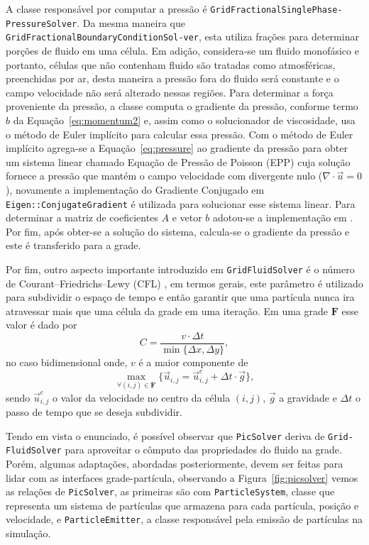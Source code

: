 \documentclass[12pt,a4paper,dvipsnames]{article}
\newcommand{\figref}[1]{Figura~\ref{#1}}
\newcommand{\eqnref}[1]{Equação~\eqref{#1}}
\begin{document}
A classe responsável por computar a pressão é \texttt{GridFractionalSinglePhase-\linebreak PressureSolver}. Da mesma maneira que \texttt{GridFractionalBoundaryConditionSol-\linebreak ver}, esta utiliza frações para determinar porções de fluido em uma célula. Em adição, considera-se um fluido monofásico e portanto, células que não contenham fluido são tratadas como atmosféricas, preenchidas por ar, desta maneira a pressão fora do fluido será constante e o campo velocidade não será alterado nessas regiões. Para determinar a força proveniente da pressão, a classe computa o gradiente da pressão, conforme termo $b$ da \eqnref{eq:momentum2} e, assim como o solucionador de viscosidade, usa o método de Euler implícito para calcular essa pressão. Com o método de Euler implícito agrega-se a \eqnref{eq:pressure} ao gradiente da pressão para obter um sistema linear chamado Equação de Pressão de Poisson (EPP) cuja solução fornece a pressão que mantém o campo velocidade com divergente nulo ($\nabla \cdot \Vec{u} = 0$), novamente a implementação do Gradiente Conjugado em \texttt{Eigen::ConjugateGradient} é utilizada para solucionar esse sistema linear. Para determinar a matriz de coeficientes $A$ e vetor $b$ adotou-se a implementação em \cite{fluidcoupling07}. Por fim, após obter-se a solução do sistema, calcula-se o gradiente da pressão e este é transferido para a grade.

Por fim, outro aspecto importante introduzido em \texttt{GridFluidSolver} é o número de Courant–Friedrichs–Lewy (CFL) \cite{cflnumber}, em termos gerais, este parâmetro é utilizado para subdividir o espaço de tempo e então garantir que uma partícula nunca ira atravessar mais que uma célula da grade em uma iteração. Em uma grade $\mathbf{F}$ esse valor é dado por
\begin{equation}
    C = \frac{v \cdot \Delta t}{\min \{ \Delta x, \Delta y \}},   
\end{equation}
no caso bidimensional onde, $v$ é a maior componente de
\begin{equation}
    \max_{\forall (i, j) \in \mathbf{F}} \{\Vec{u}_{i, j} = \Vec{u}^c_{i, j} + \Delta t \cdot \Vec{g}\},
\end{equation}
sendo $\Vec{u}^c_{i, j}$ o valor da velocidade no centro da célula $(i, j)$, $\Vec{g}$ a gravidade e $\Delta t$ o passo de tempo que se deseja subdividir.

Tendo em vista o enunciado, é possível observar que \texttt{PicSolver} deriva de \texttt{Grid-\linebreak FluidSolver} para aproveitar o cômputo das propriedades do fluido na grade. Porém, algumas adaptações, abordadas posteriormente, devem ser feitas para  lidar com as interfaces grade-partícula, observando a \figref{fig:picsolver} vemos as relações de \texttt{PicSolver}, as primeiras são com \texttt{ParticleSystem}, classe que representa um sistema de partículas que armazena para cada partícula, posição e velocidade, e \texttt{ParticleEmitter}, a classe responsável pela emissão de partículas na simulação.
\end{document}
